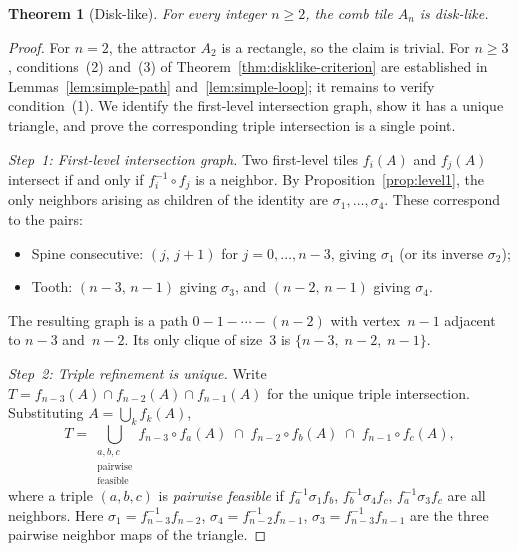 \documentclass{amsart}
\newtheorem{theorem}{Theorem}[section]
\theoremstyle{definition}
\theoremstyle{remark}
\begin{document}
\begin{theorem}[Disk-like]\label{thm:disklike}
For every integer $n \ge 2$, the comb tile $A_n$ is disk-like.
\end{theorem}

\begin{proof}
For $n = 2$, the attractor $A_2$ is a rectangle, so the claim is
trivial.  For $n \ge 3$, conditions~(2) and~(3) of
Theorem~\ref{thm:disklike-criterion} are established in
Lemmas~\ref{lem:simple-path} and~\ref{lem:simple-loop}; it remains to
verify condition~(1).  We identify the first-level intersection graph,
show it has a unique triangle, and prove the corresponding triple
intersection is a single point.

\emph{Step~1: First-level intersection graph.}
Two first-level tiles $f_i(A)$ and $f_j(A)$ intersect if and only if
$f_i^{-1} \circ f_j$ is a neighbor.
By Proposition~\ref{prop:level1}, the only neighbors arising as
children of the identity are $\sigma_1, \ldots, \sigma_4$.  These
correspond to the pairs:
\begin{itemize}
\item Spine consecutive: $(j,\, j{+}1)$ for $j = 0, \ldots, n{-}3$,
  giving $\sigma_1$ (or its inverse $\sigma_2$);
\item Tooth: $(n{-}3,\, n{-}1)$ giving $\sigma_3$, and
  $(n{-}2,\, n{-}1)$ giving $\sigma_4$.
\end{itemize}
The resulting graph is a path $0 {-} 1 {-} \cdots {-} (n{-}2)$ with
vertex~$n{-}1$ adjacent to $n{-}3$ and~$n{-}2$.  Its only clique of
size~$3$ is $\{n{-}3,\; n{-}2,\; n{-}1\}$.

\emph{Step~2: Triple refinement is unique.}
Write $T = f_{n-3}(A) \cap f_{n-2}(A) \cap f_{n-1}(A)$ for the
unique triple intersection.  Substituting $A = \bigcup_k f_k(A)$,
\[
  T = \bigcup_{\substack{a,b,c \\ \text{pairwise}\\\text{feasible}}}
  f_{n-3} \circ f_a(A) \;\cap\;
  f_{n-2} \circ f_b(A) \;\cap\;
  f_{n-1} \circ f_c(A),
\]
where a triple $(a, b, c)$ is \emph{pairwise feasible} if
$f_a^{-1} \sigma_1 f_b$,\; $f_b^{-1} \sigma_4 f_c$,\;
$f_a^{-1} \sigma_3 f_c$ are all neighbors.
Here $\sigma_1 = f_{n-3}^{-1} f_{n-2}$,
$\sigma_4 = f_{n-2}^{-1} f_{n-1}$,
$\sigma_3 = f_{n-3}^{-1} f_{n-1}$ are the three pairwise neighbor
maps of the triangle.


\end{proof}
\end{document}
